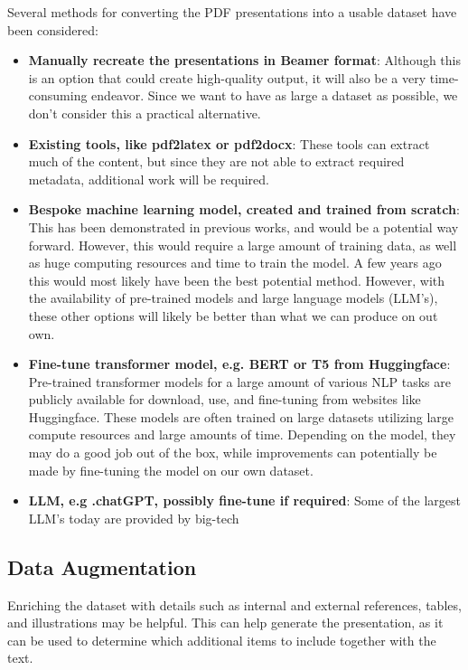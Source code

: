 Several methods for converting the PDF presentations into a usable dataset have been considered:

\begin{itemize}
    \item \textbf{Manually recreate the presentations in Beamer format}: Although this is an option that could create high-quality output, it will also be a very time-consuming endeavor. Since we want to have as large a dataset as possible, we don't consider this a practical alternative.
    \item \textbf{Existing tools, like pdf2latex or pdf2docx}: These tools can extract much of the content, but since they are not able to extract required metadata, additional work will be required.
    \item \textbf{Bespoke machine learning model, created and trained from scratch}: This has been demonstrated in previous works, and would be a potential way forward. However, this would require a large amount of training data, as well as huge computing resources and time to train the model. A few years ago this would most likely have been the best potential method. However, with the availability of pre-trained models and large language models (LLM's), these other options will likely be better than what we can produce on out own.
    \item \textbf{Fine-tune transformer model, e.g. BERT or T5 from Huggingface}: Pre-trained transformer models for a large amount of various NLP tasks are publicly available for download, use, and fine-tuning from websites like Huggingface. These models are often trained on large datasets utilizing large compute resources and large amounts of time. Depending on the model, they may do a good job out of the box, while improvements can potentially be made by fine-tuning the model on our own dataset.
    \item \textbf{LLM, e.g .chatGPT, possibly fine-tune if required}: Some of the largest LLM's today are provided by big-tech 
\end{itemize}

\subsection{Data Augmentation}
Enriching the dataset with details such as internal and external references, tables, and illustrations may be helpful. This can help generate the presentation, as it can be used to determine which additional items to include together with the text.

